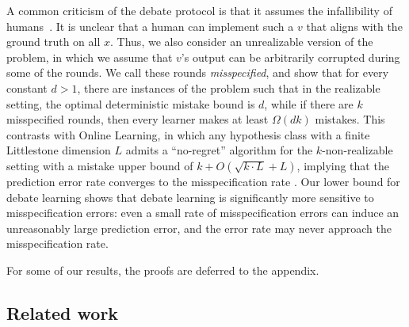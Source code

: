 A common criticism of the debate protocol is that it assumes the infallibility of humans~\citep{irving2019social,browncohen2024debate,parrish2022single,parrish2022two}. It is unclear that a human can implement such a $v$ that aligns with the ground truth on all $x$. Thus, we also consider an unrealizable version of the problem, in which we assume that $v$'s output can be arbitrarily corrupted during some of the rounds. We call these rounds \emph{misspecified}, and show that for every constant $d > 1$, there are instances of the problem such that in the realizable setting, the optimal deterministic mistake bound is $d$, while if there are $k$ misspecified rounds, 
then every learner makes at least $\Omega(dk)$ mistakes. This contrasts with Online Learning, in which any hypothesis class with a finite Littlestone dimension $L$ admits a ``no-regret'' algorithm for the $k$-non-realizable setting with a mistake upper bound of $k +O(\sqrt{k\cdot L} + L)$, implying that the prediction error rate converges to the misspecification rate \citep{FilmusHaMeMo23,BenDavidPaSh09,AlonBeDaMoNaYo21}. 
Our lower bound for debate learning shows that debate learning is significantly more  sensitive to misspecification errors: even a small rate of misspecification errors can induce an unreasonably large prediction error, and the error rate may never approach the misspecification rate. 

For some of our results, the proofs are deferred to the appendix.

\subsection{Related work}

